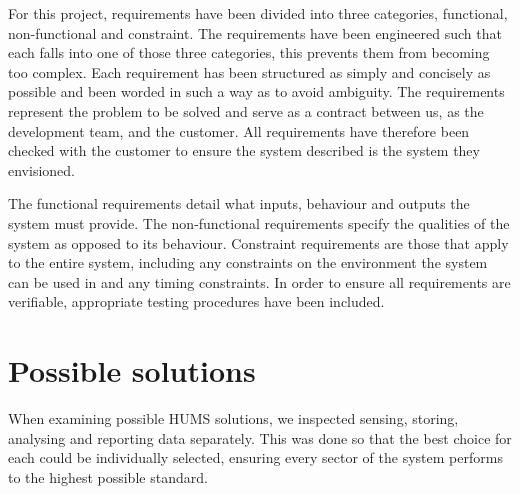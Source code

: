 \documentclass[10pt,a4paper]{article}
\begin{document}
For this project, requirements have been divided into three categories,
functional, non-functional and constraint. The requirements have been
engineered such that each falls into one of those three categories, this
prevents them from becoming too complex. Each requirement has been
structured as simply and concisely as possible and been worded in such a way
as to avoid ambiguity. The requirements represent the problem to be solved
and serve as a contract between us, as the development team, and the
customer. All requirements have therefore been checked with the customer to
ensure the system described is the system they envisioned.

The functional requirements detail what inputs, behaviour and outputs the system
must provide. The non-functional requirements specify the qualities of the
system as opposed to its behaviour. Constraint requirements are those that apply
to the entire system, including any constraints on the environment the system
can be used in and any timing constraints. In order to ensure all requirements
are verifiable, appropriate testing procedures have been included.








\section{Possible solutions}

When examining possible HUMS solutions, we inspected sensing, storing, analysing
and reporting data separately. This was done so that the best choice for each
could be individually selected, ensuring every sector of the system performs to
the highest possible standard.
\end{document}
